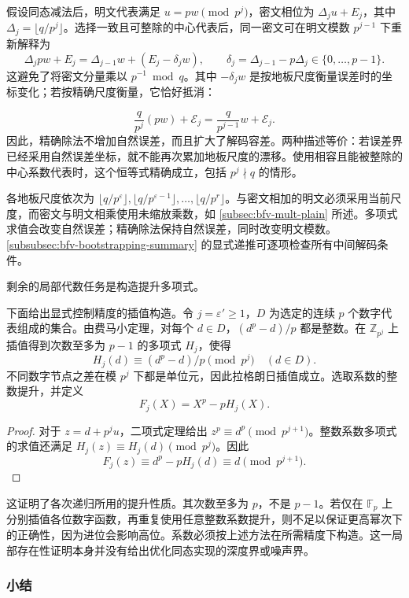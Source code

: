 假设同态减法后，明文代表满足 $u=pw\pmod{p^j}$，密文相位为 $\Delta_j u+E_j$，其中 $\Delta_j=\lfloor q/p^j\rfloor$。选择一致且可整除的中心代表后，同一密文可在明文模数 $p^{j-1}$ 下重新解释为
\[
\Delta_jpw+E_j=\Delta_{j-1}w+(E_j-\delta_jw),\qquad
\delta_j=\Delta_{j-1}-p\Delta_j\in\{0,\ldots,p-1\}.
\]
这避免了将密文分量乘以 $p^{-1}\bmod q$。其中 $-\delta_jw$ 是按地板尺度衡量误差时的坐标变化；若按精确尺度衡量，它恰好抵消：

\[
\frac{q}{p^j}(pw)+\mathcal E_j
=\frac{q}{p^{j-1}}w+\mathcal E_j.
\]
因此，精确除法不增加自然误差，而且扩大了解码容差。两种描述等价：若误差界已经采用自然误差坐标，就不能再次累加地板尺度的漂移。使用相容且能被整除的中心系数代表时，这个恒等式精确成立，包括 $p^j\nmid q$ 的情形。

各地板尺度依次为 $\lfloor q/p^\varepsilon\rfloor,\lfloor q/p^{\varepsilon-1}\rfloor,\ldots,\lfloor q/p^r\rfloor$。与密文相加的明文必须采用当前尺度，而密文与明文相乘使用未缩放乘数，如 \autoref{subsec:bfv-mult-plain} 所述。多项式求值会改变自然误差；精确除法保持自然误差，同时改变明文模数。\autoref{subsubsec:bfv-bootstrapping-summary} 的显式递推可逐项检查所有中间解码条件。

剩余的局部代数任务是构造提升多项式。

下面给出显式控制精度的插值构造。令 $j=\varepsilon'\geq1$，$D$ 为选定的连续 $p$ 个数字代表组成的集合。由费马小定理，对每个 $d\in D$，$(d^p-d)/p$ 都是整数。在 $\mathbb Z_{p^j}$ 上插值得到次数至多为 $p-1$ 的多项式 $H_j$，使得
\[
H_j(d)\equiv(d^p-d)/p\pmod{p^j}\quad(d\in D).
\]
不同数字节点之差在模 $p^j$ 下都是单位元，因此拉格朗日插值成立。选取系数的整数提升，并定义
\[
F_j(X)=X^p-pH_j(X).
\]
\begin{proof}
对于 $z=d+p^ju$，二项式定理给出 $z^p\equiv d^p\pmod{p^{j+1}}$。整数系数多项式的求值还满足 $H_j(z)\equiv H_j(d)\pmod{p^j}$。因此
\[
F_j(z)\equiv d^p-pH_j(d)\equiv d\pmod{p^{j+1}}.
\]
\end{proof}
这证明了各次递归所用的提升性质。其次数至多为 $p$，不是 $p-1$。若仅在 $\mathbb F_p$ 上分别插值各位数字函数，再重复使用任意整数系数提升，则不足以保证更高幂次下的正确性，因为进位会影响高位。系数必须按上述方法在所需精度下构造。这一局部存在性证明本身并没有给出优化同态实现的深度界或噪声界。

\subsubsection{小结}
\label{subsubsec:bfv-bootstrapping-summary}

